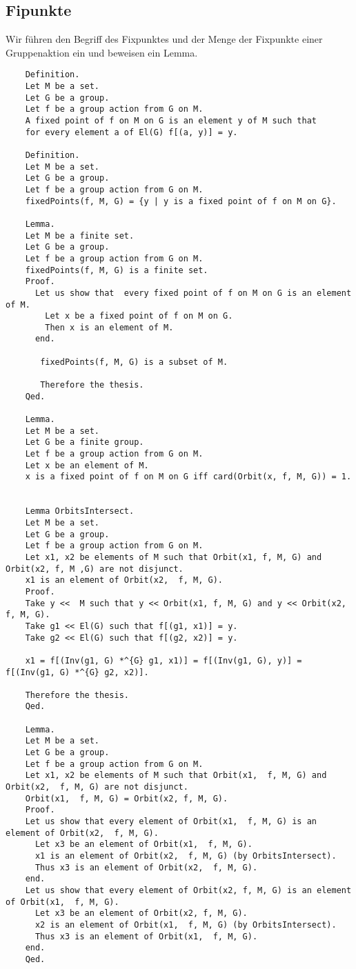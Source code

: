 \documentclass[a4paper,12pt]{scrartcl}
\begin{document}
\subsection{Fipunkte}

Wir führen den Begriff des Fixpunktes und der Menge der Fixpunkte einer Gruppenaktion ein und beweisen ein Lemma.


\begin{lstlisting}
	Definition.
	Let M be a set.
	Let G be a group.
	Let f be a group action from G on M.
	A fixed point of f on M on G is an element y of M such that
	for every element a of El(G) f[(a, y)] = y.
	
	Definition.
	Let M be a set.
	Let G be a group.
	Let f be a group action from G on M.
	fixedPoints(f, M, G) = {y | y is a fixed point of f on M on G}.
	
	Lemma.
	Let M be a finite set.
	Let G be a group.
	Let f be a group action from G on M.
	fixedPoints(f, M, G) is a finite set.
	Proof.
	  Let us show that  every fixed point of f on M on G is an element of M.
		Let x be a fixed point of f on M on G.
		Then x is an element of M.
	  end.
	
	   fixedPoints(f, M, G) is a subset of M.
	
	   Therefore the thesis.
	Qed.
	
	Lemma.
	Let M be a set.
	Let G be a finite group.
	Let f be a group action from G on M.
	Let x be an element of M.
	x is a fixed point of f on M on G iff card(Orbit(x, f, M, G)) = 1.
	
	
	Lemma OrbitsIntersect.
	Let M be a set.
	Let G be a group.
	Let f be a group action from G on M.
	Let x1, x2 be elements of M such that Orbit(x1, f, M, G) and Orbit(x2, f, M ,G) are not disjunct.
	x1 is an element of Orbit(x2,  f, M, G).
	Proof.
	Take y <<  M such that y << Orbit(x1, f, M, G) and y << Orbit(x2, f, M, G).
	Take g1 << El(G) such that f[(g1, x1)] = y.
	Take g2 << El(G) such that f[(g2, x2)] = y.
	
	x1 = f[(Inv(g1, G) *^{G} g1, x1)] = f[(Inv(g1, G), y)] = f[(Inv(g1, G) *^{G} g2, x2)].
	
	Therefore the thesis.
	Qed.
	
	Lemma.
	Let M be a set.
	Let G be a group.
	Let f be a group action from G on M.
	Let x1, x2 be elements of M such that Orbit(x1,  f, M, G) and Orbit(x2,  f, M, G) are not disjunct.
	Orbit(x1,  f, M, G) = Orbit(x2, f, M, G).
	Proof.
	Let us show that every element of Orbit(x1,  f, M, G) is an element of Orbit(x2,  f, M, G).
	  Let x3 be an element of Orbit(x1,  f, M, G).
	  x1 is an element of Orbit(x2,  f, M, G) (by OrbitsIntersect).
	  Thus x3 is an element of Orbit(x2,  f, M, G).
	end.
	Let us show that every element of Orbit(x2, f, M, G) is an element of Orbit(x1,  f, M, G).
	  Let x3 be an element of Orbit(x2, f, M, G).
	  x2 is an element of Orbit(x1,  f, M, G) (by OrbitsIntersect).
	  Thus x3 is an element of Orbit(x1,  f, M, G).
	end.
	Qed.
	

\end{lstlisting}
\end{document}
